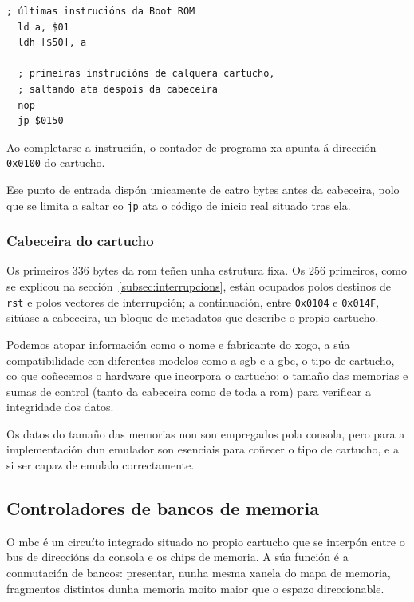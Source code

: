 \begin{lstlisting}[language={[x86masm]Assembler}, label={lst:bootrom-unmap}]
  ; últimas instrucións da Boot ROM
  ld a, $01
  ldh [$50], a

  ; primeiras instrucións de calquera cartucho,
  ; saltando ata despois da cabeceira
  nop
  jp $0150
\end{lstlisting}

Ao completarse a instrución, o contador de programa
xa apunta á dirección \texttt{0x0100} do cartucho.

Ese punto de entrada dispón unicamente de catro bytes antes da cabeceira, polo que se
limita a saltar co \texttt{jp} ata o código de inicio real situado tras ela.

\subsubsection{Cabeceira do cartucho}

Os primeiros 336 bytes da \acrshort{rom} teñen unha estrutura fixa.
Os 256 primeiros, como se explicou na sección~\ref{subsec:interrupcions}, están ocupados
polos destinos de \texttt{rst} e polos vectores de interrupción; a continuación, entre
\texttt{0x0104} e \texttt{0x014F}, sitúase a cabeceira, un bloque de metadatos que describe
o propio cartucho.

Podemos atopar información como o nome e fabricante do xogo, a súa compatibilidade con diferentes
modelos como a \acrfull{sgb} e a \acrfull{gbc}, o tipo de cartucho, co que coñecemos o
hardware que incorpora o cartucho; o tamaño das memorias e sumas de control
(tanto da cabeceira como de toda a \acrshort{rom}) para verificar a integridade dos datos.

Os datos do tamaño das memorias non son empregados pola consola, pero para a implementación dun emulador son 
esenciais para coñecer o tipo de cartucho, e a si ser capaz de emulalo correctamente.

\subsection{Controladores de bancos de memoria}
\label{sec:mbc}

O \acrshort{mbc} é un circuíto integrado situado no propio cartucho que se interpón entre
o bus de direccións da consola e os chips de memoria.
A súa función é a conmutación de bancos: presentar, nunha mesma xanela do mapa de memoria,
fragmentos distintos dunha memoria moito maior que o espazo direccionable.

